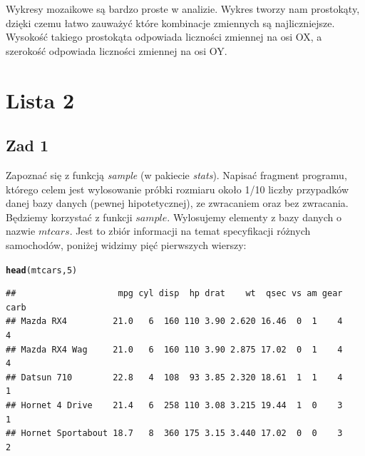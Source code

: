 \documentclass[12pt]{mwart}\usepackage[]{graphicx}\usepackage[]{color}
\makeatletter
\newcommand{\hlnum}[1]{\textcolor[rgb]{0.686,0.059,0.569}{#1}}%
\newcommand{\hlstd}[1]{\textcolor[rgb]{0.345,0.345,0.345}{#1}}%
\newcommand{\hlkwd}[1]{\textcolor[rgb]{0.737,0.353,0.396}{\textbf{#1}}}%
\newenvironment{kframe}{%
 \def\at@end@of@kframe{}%
 \ifinner\ifhmode%
  \def\at@end@of@kframe{\end{minipage}}%
  \begin{minipage}{\columnwidth}%
 \fi\fi%
 \def\FrameCommand##1{\hskip\@totalleftmargin \hskip-\fboxsep
 \colorbox{shadecolor}{##1}\hskip-\fboxsep
     \hskip-\linewidth \hskip-\@totalleftmargin \hskip\columnwidth}%
 \MakeFramed {\advance\hsize-\width
   \@totalleftmargin\z@ \linewidth\hsize
   \@setminipage}}%
 {\par\unskip\endMakeFramed%
 \at@end@of@kframe}
\newenvironment{knitrout}{}{} %
\makeatother
\begin{document}
Wykresy mozaikowe są bardzo proste w analizie. Wykres tworzy nam prostokąty, dzięki czemu łatwo zauważyć które kombinacje zmiennych są najliczniejsze. Wysokość takiego prostokąta odpowiada liczności zmiennej na osi OX, a szerokość odpowiada liczności zmiennej na osi OY.
\section*{Lista 2}
\subsection*{Zad 1}
Zapoznać się z funkcją \textit{sample} (w pakiecie \textit{stats}). Napisać fragment programu, którego celem jest wylosowanie próbki rozmiaru około 1/10 liczby przypadków danej
bazy danych (pewnej hipotetycznej), ze zwracaniem oraz bez zwracania.
\newline\newline
Będziemy korzystać z funkcji $sample$. Wylosujemy elementy z bazy danych o nazwie $mtcars$. Jest to zbiór informacji na temat specyfikacji różnych samochodów, poniżej widzimy pięć pierwszych wierszy:
\begin{knitrout}
\color{fgcolor}\begin{kframe}
\begin{alltt}
\hlkwd{head}\hlstd{(mtcars,}\hlnum{5}\hlstd{)}
\end{alltt}
\begin{verbatim}
##                    mpg cyl disp  hp drat    wt  qsec vs am gear carb
## Mazda RX4         21.0   6  160 110 3.90 2.620 16.46  0  1    4    4
## Mazda RX4 Wag     21.0   6  160 110 3.90 2.875 17.02  0  1    4    4
## Datsun 710        22.8   4  108  93 3.85 2.320 18.61  1  1    4    1
## Hornet 4 Drive    21.4   6  258 110 3.08 3.215 19.44  1  0    3    1
## Hornet Sportabout 18.7   8  360 175 3.15 3.440 17.02  0  0    3    2
\end{verbatim}
\end{kframe}
\end{knitrout}
\end{document}

